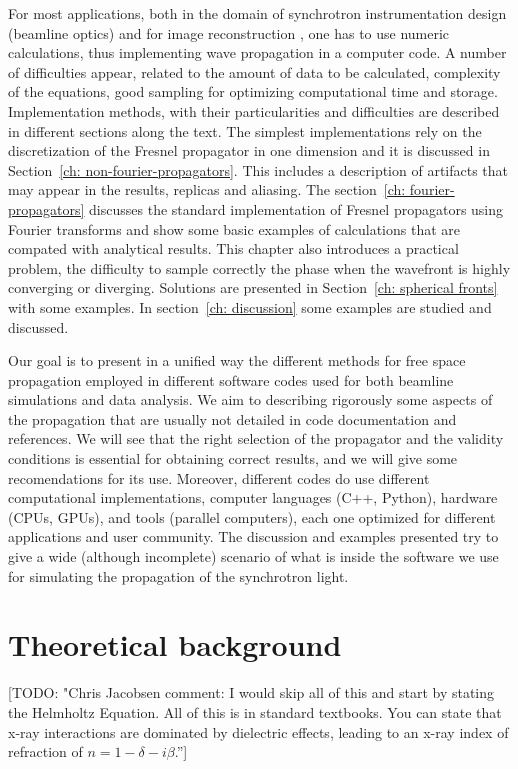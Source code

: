 \documentclass{iucr}              %
\newcommand{\todo}[1]{{\color{red}[TODO: "#1'']}}
\begin{document}
For most applications, both in the domain of synchrotron instrumentation design (beamline optics) and for image reconstruction \cite{maiden_josaa_2012,gilles_optica_2018}, one has to use numeric calculations, thus implementing wave propagation in a computer code. A number of difficulties appear, related to the amount of data to be calculated, complexity of the equations, good sampling for optimizing computational time and storage. Implementation methods, with their particularities and difficulties are described in different sections along the text. The simplest implementations rely on the discretization of the Fresnel propagator in one dimension and it is discussed in Section~\ref{ch: non-fourier-propagators}. This includes a description of artifacts that may appear in the results, replicas and aliasing. The section~\ref{ch: fourier-propagators} discusses the standard implementation of Fresnel propagators using Fourier transforms and show some basic examples of calculations that are compated with analytical results. This chapter also introduces a practical problem, the difficulty to sample correctly the phase when the wavefront is highly converging or diverging. Solutions are presented in Section~\ref{ch: spherical fronts} with some examples. In section~\ref{ch: discussion} some examples are studied and discussed.

Our goal is to present in a unified way the different methods for free space propagation employed in different software codes used for both beamline simulations and data analysis. We aim to describing rigorously some aspects of the propagation that are usually not detailed in code documentation and references. We will see that the right selection of the propagator and the validity conditions is essential for obtaining correct results, and we will give some recomendations for its use. Moreover, different codes do use different computational implementations, computer languages (C++, Python), hardware (CPUs, GPUs), and tools (parallel computers), each one optimized for different applications and user community. The discussion and examples presented try to give a wide (although incomplete) scenario of what is inside the software we use for simulating the propagation of the synchrotron light.   

\section{Theoretical background}
\label{ch: theory}

\todo{Chris Jacobsen comment: I would skip all of this and start by stating the Helmholtz Equation.  All of this is in standard textbooks. You can state that x-ray interactions are dominated by dielectric effects, leading to an x-ray index of refraction of $n=1-\delta-i\beta$.}
\end{document}
